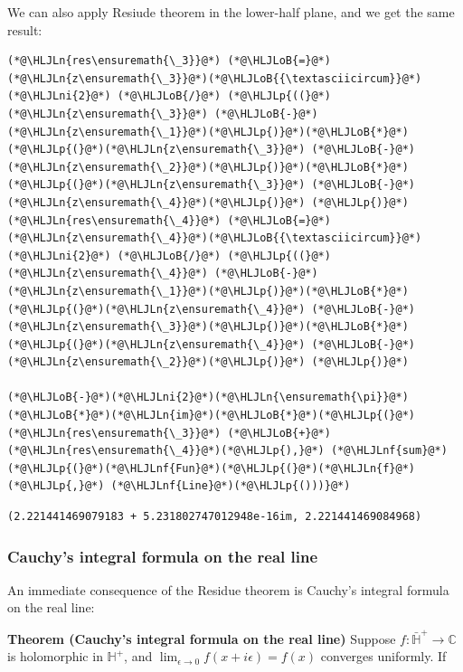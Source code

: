 \documentclass[12pt,a4paper]{article}
\newcommand{\HLJLn}[1]{#1}
\newcommand{\HLJLnf}[1]{\textcolor[RGB]{66,102,213}{#1}}
\newcommand{\HLJLni}[1]{\textcolor[RGB]{59,151,46}{#1}}
\newcommand{\HLJLoB}[1]{\textcolor[RGB]{102,102,102}{\textbf{#1}}}
\newcommand{\HLJLp}[1]{#1}
\begin{document}
We can also apply Resiude theorem in the lower-half plane, and we get the same result:


\begin{lstlisting}
(*@\HLJLn{res\ensuremath{\_3}}@*) (*@\HLJLoB{=}@*) (*@\HLJLn{z\ensuremath{\_3}}@*)(*@\HLJLoB{{\textasciicircum}}@*)(*@\HLJLni{2}@*) (*@\HLJLoB{/}@*) (*@\HLJLp{((}@*)(*@\HLJLn{z\ensuremath{\_3}}@*) (*@\HLJLoB{-}@*) (*@\HLJLn{z\ensuremath{\_1}}@*)(*@\HLJLp{)}@*)(*@\HLJLoB{*}@*)(*@\HLJLp{(}@*)(*@\HLJLn{z\ensuremath{\_3}}@*) (*@\HLJLoB{-}@*) (*@\HLJLn{z\ensuremath{\_2}}@*)(*@\HLJLp{)}@*)(*@\HLJLoB{*}@*)(*@\HLJLp{(}@*)(*@\HLJLn{z\ensuremath{\_3}}@*) (*@\HLJLoB{-}@*) (*@\HLJLn{z\ensuremath{\_4}}@*)(*@\HLJLp{)}@*) (*@\HLJLp{)}@*)
(*@\HLJLn{res\ensuremath{\_4}}@*) (*@\HLJLoB{=}@*) (*@\HLJLn{z\ensuremath{\_4}}@*)(*@\HLJLoB{{\textasciicircum}}@*)(*@\HLJLni{2}@*) (*@\HLJLoB{/}@*) (*@\HLJLp{((}@*)(*@\HLJLn{z\ensuremath{\_4}}@*) (*@\HLJLoB{-}@*) (*@\HLJLn{z\ensuremath{\_1}}@*)(*@\HLJLp{)}@*)(*@\HLJLoB{*}@*)(*@\HLJLp{(}@*)(*@\HLJLn{z\ensuremath{\_4}}@*) (*@\HLJLoB{-}@*) (*@\HLJLn{z\ensuremath{\_3}}@*)(*@\HLJLp{)}@*)(*@\HLJLoB{*}@*)(*@\HLJLp{(}@*)(*@\HLJLn{z\ensuremath{\_4}}@*) (*@\HLJLoB{-}@*) (*@\HLJLn{z\ensuremath{\_2}}@*)(*@\HLJLp{)}@*) (*@\HLJLp{)}@*)

(*@\HLJLoB{-}@*)(*@\HLJLni{2}@*)(*@\HLJLn{\ensuremath{\pi}}@*)(*@\HLJLoB{*}@*)(*@\HLJLn{im}@*)(*@\HLJLoB{*}@*)(*@\HLJLp{(}@*)(*@\HLJLn{res\ensuremath{\_3}}@*) (*@\HLJLoB{+}@*) (*@\HLJLn{res\ensuremath{\_4}}@*)(*@\HLJLp{),}@*) (*@\HLJLnf{sum}@*)(*@\HLJLp{(}@*)(*@\HLJLnf{Fun}@*)(*@\HLJLp{(}@*)(*@\HLJLn{f}@*)(*@\HLJLp{,}@*) (*@\HLJLnf{Line}@*)(*@\HLJLp{()))}@*)
\end{lstlisting}

\begin{lstlisting}
(2.221441469079183 + 5.231802747012948e-16im, 2.221441469084968)
\end{lstlisting}


\subsubsection{Cauchy's integral formula on the real line}
An immediate consequence of the Residue theorem is Cauchy's integral formula on the real line:

\textbf{Theorem (Cauchy's integral formula on the real line)} Suppose $f : \bar {\mathbb H}^+  \rightarrow {\mathbb C}$ is holomorphic in ${\mathbb H}^+ $, and  $\lim_{\epsilon \rightarrow 0} f(x + i \epsilon) = f(x)$ converges uniformly.  If 
\end{document}
